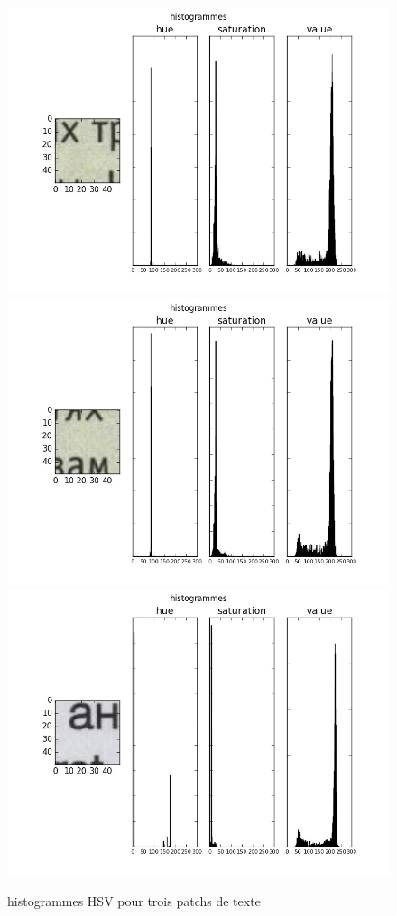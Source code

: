 \documentclass{book}
\begin{document}
\begin{figure}[H]
\begin{center}
\includegraphics[scale=0.3]{images/histo_hsv_texte.jpg}
\includegraphics[scale=0.3]{images/histo_hsv_texte2.jpg}
\includegraphics[scale=0.3]{images/histo_hsv_texte3.jpg}
\end{center}
\caption{histogrammes HSV pour trois patchs de texte}
\label{histo_hsv_texte}
\end{figure}
\end{document}
